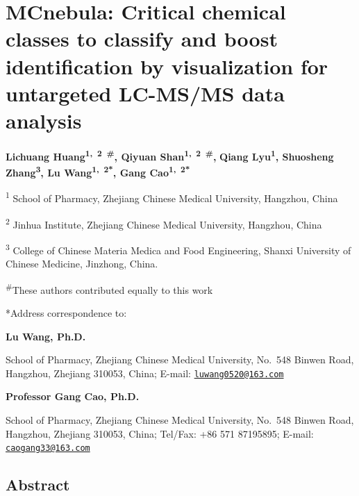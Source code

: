 \documentclass[
]{article}
\author{}
\date{\vspace{-2.5em}}
\begin{document}
\hypertarget{mcnebula-critical-chemical-classes-to-classify-and-boost-identification-by-visualization-for-untargeted-lc-msms-data-analysis}{%
\section{MCnebula: Critical chemical classes to classify and boost
identification by visualization for untargeted LC-MS/MS data
analysis}\label{mcnebula-critical-chemical-classes-to-classify-and-boost-identification-by-visualization-for-untargeted-lc-msms-data-analysis}}

\textbf{Lichuang Huang\textsuperscript{1,~2~\#}, Qiyuan
Shan\textsuperscript{1,~2~\#},} \textbf{Qiang Lyu\textsuperscript{1},
Shuosheng Zhang\textsuperscript{3}, Lu Wang\textsuperscript{1,~2*}, Gang
Cao\textsuperscript{1,~2*}}

\textsuperscript{1} School of Pharmacy, Zhejiang Chinese Medical
University, Hangzhou, China

\textsuperscript{2} Jinhua Institute, Zhejiang Chinese Medical
University, Hangzhou, China

\textsuperscript{3} College of Chinese Materia Medica and Food
Engineering, Shanxi University of Chinese Medicine, Jinzhong, China.

\textsuperscript{\#}These authors contributed equally to this work

*Address correspondence to:

\textbf{Lu Wang, Ph.D.}

School of Pharmacy, Zhejiang Chinese Medical University, No.~548 Binwen
Road, Hangzhou, Zhejiang 310053, China; E-mail:
\href{mailto:luwang0520@163.com}{\nolinkurl{luwang0520@163.com}}

\textbf{Professor Gang Cao, Ph.D.}

School of Pharmacy, Zhejiang Chinese Medical University, No.~548 Binwen
Road, Hangzhou, Zhejiang 310053, China; Tel/Fax: +86 571 87195895;
E-mail: \href{mailto:caogang33@163.com}{\nolinkurl{caogang33@163.com}}

\hypertarget{abstract}{%
\subsection{Abstract}\label{abstract}}
\end{document}

